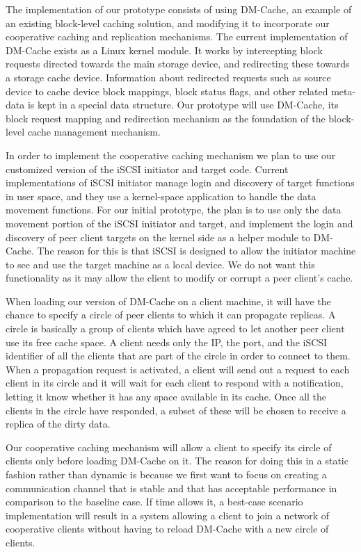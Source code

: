 The implementation of our prototype consists of using DM-Cache,
an example of an existing block-level caching solution, and
modifying it to incorporate our cooperative caching and
replication mechanisms. The current implementation of DM-Cache exists as a Linux kernel module. It works by intercepting block requests directed towards the main storage device, and redirecting these towards a storage cache device. Information about redirected requests such as source device to cache device block mappings, block status flags, and other related meta-data is kept in a special data structure. Our prototype will use DM-Cache, its block request mapping and redirection mechanism as the foundation of the block-level cache management mechanism.

In order to implement the cooperative caching mechanism we plan to use our customized version of the iSCSI initiator and target code. Current implementations of iSCSI initiator manage login and discovery of target functions in user space, and they use a kernel-space application to handle the data movement functions. For our initial prototype, the plan is to use only the data movement portion of the iSCSI initiator and target, and implement the login and discovery of peer client targets on the kernel side as a helper module to DM-Cache. The reason for this is that iSCSI is designed to allow the initiator machine to see and use the target machine as a local device. We do not want this functionality as it may allow the client to modify or corrupt a peer client's cache.

When loading our version of DM-Cache on a client machine, it will have the chance to specify a circle of peer clients to which it can propagate replicas. A circle is basically a group of clients which have agreed to let another peer client use its free cache space. A client needs only the IP, the port, and the iSCSI identifier of all the clients that are part of the circle in order to connect to them. When a propagation request is activated, a client will send out a request to each client in its circle and it will wait for each client to respond with a notification, letting it know whether it has any space available in its cache. Once all the clients in the circle have responded, a subset of these will be chosen to receive a replica of the dirty data.

Our cooperative caching mechanism will allow a client to specify its circle of clients only before loading DM-Cache on it. The reason for doing this in a static fashion rather than dynamic is because we first want to focus on creating a communication channel that is stable and that has acceptable performance in comparison to the baseline case. If time allows it, a best-case scenario implementation will result in a system allowing a client to join a network of cooperative clients without having to reload DM-Cache with a new circle of clients.

